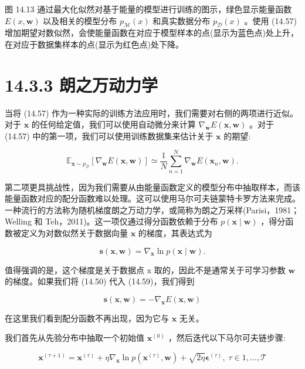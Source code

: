 \documentclass[10pt]{report}
\begin{document}
图 14.13 通过最大化似然对基于能量的模型进行训练的图示，绿色显示能量函数 \(E\left( {x,\mathbf{w}}\right)\) 以及相关的模型分布 \({p}_{\mathcal{M}}\left( x\right)\) 和真实数据分布 \({p}_{\mathcal{D}}\left( x\right)\) 。使用 (14.57) 增加期望对数似然，会使能量函数在对应于模型样本的点(显示为蓝色点)处上升，在对应于数据集样本的点(显示为红色点)处下降。

\section*{14.3.3 朗之万动力学}

当将 (14.57) 作为一种实际的训练方法应用时，我们需要对右侧的两项进行近似。对于 \(\mathbf{x}\) 的任何给定值，我们可以使用自动微分来计算 \({\nabla }_{\mathbf{w}}E\left( {\mathbf{x},\mathbf{w}}\right)\) 。对于 (14.57) 中的第一项，我们可以使用训练数据集来估计关于 \(\mathbf{x}\) 的期望:

\[
{\mathbb{E}}_{\mathbf{x} \sim  {p}_{\mathcal{D}}}\left\lbrack  {{\nabla }_{\mathbf{w}}E\left( {\mathbf{x},\mathbf{w}}\right) }\right\rbrack   \simeq  \frac{1}{N}\mathop{\sum }\limits_{{n = 1}}^{N}{\nabla }_{\mathbf{w}}E\left( {{\mathbf{x}}_{n},\mathbf{w}}\right) . \tag{14.58}
\]

第二项更具挑战性，因为我们需要从由能量函数定义的模型分布中抽取样本，而该能量函数对应的配分函数难以处理。这可以使用马尔可夫链蒙特卡罗方法来完成。一种流行的方法称为随机梯度朗之万动力学，或简称为朗之万采样(Parisi，1981；Welling 和 Teh，2011)。这一项仅通过得分函数依赖于分布 \(p\left( {\mathbf{x} \mid  \mathbf{w}}\right)\) ，得分函数被定义为对数似然关于数据向量 \(\mathbf{x}\) 的梯度，其表达式为

\[
\mathbf{s}\left( {\mathbf{x},\mathbf{w}}\right)  = {\nabla }_{\mathbf{x}}\ln p\left( {\mathbf{x} \mid  \mathbf{w}}\right) . \tag{14.59}
\]

值得强调的是，这个梯度是关于数据点 \(\mathrm{x}\) 取的，因此不是通常关于可学习参数 \(\mathbf{w}\) 的梯度。如果我们将 (14.50) 代入 (14.59)，我们得到

\[
\mathbf{s}\left( {\mathbf{x},\mathbf{w}}\right)  =  - {\nabla }_{\mathbf{x}}E\left( {\mathbf{x},\mathbf{w}}\right)  \tag{14.60}
\]

在这里我们看到配分函数不再出现，因为它与 \(\mathbf{x}\) 无关。

我们首先从先验分布中抽取一个初始值 \({\mathbf{x}}^{\left( 0\right) }\) ，然后迭代以下马尔可夫链步骤:

\[
{\mathbf{x}}^{\left( \tau  + 1\right) } = {\mathbf{x}}^{\left( \tau \right) } + \eta {\nabla }_{\mathbf{x}}\ln p\left( {{\mathbf{x}}^{\left( \tau \right) },\mathbf{w}}\right)  + \sqrt{2\eta }{\mathbf{\epsilon }}^{\left( \tau \right) },\;\tau  \in  1,\ldots ,\mathcal{T} \tag{14.61}
\]
\end{document}
